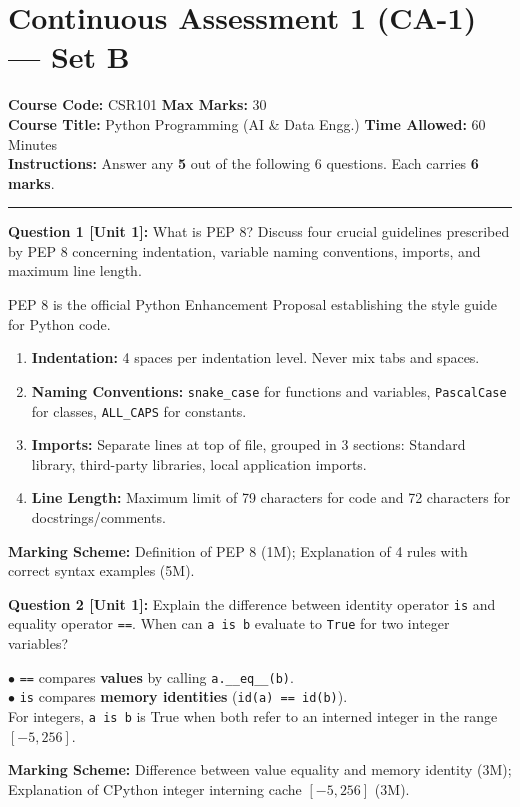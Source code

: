 \section{Continuous Assessment 1 (CA-1) --- Set B}
\noindent\textbf{Course Code:} CSR101 \hfill \textbf{Max Marks:} 30\\
\textbf{Course Title:} Python Programming (AI \& Data Engg.) \hfill \textbf{Time Allowed:} 60 Minutes\\
\textbf{Instructions:} Answer any \textbf{5} out of the following 6 questions. Each carries \textbf{6 marks}.
\vspace{4mm}
\hrule
\vspace{4mm}

\noindent\textbf{Question 1 [Unit 1]:} What is PEP 8? Discuss four crucial guidelines prescribed by PEP 8 concerning indentation, variable naming conventions, imports, and maximum line length.
\begin{solutionbox}
PEP 8 is the official Python Enhancement Proposal establishing the style guide for Python code.
\begin{enumerate}[leftmargin=1.5em, itemsep=2pt]
    \item \textbf{Indentation:} 4 spaces per indentation level. Never mix tabs and spaces.
    \item \textbf{Naming Conventions:} \texttt{snake\_case} for functions and variables, \texttt{PascalCase} for classes, \texttt{ALL\_CAPS} for constants.
    \item \textbf{Imports:} Separate lines at top of file, grouped in 3 sections: Standard library, third-party libraries, local application imports.
    \item \textbf{Line Length:} Maximum limit of 79 characters for code and 72 characters for docstrings/comments.
\end{enumerate}
\end{solutionbox}
\begin{markingrubric}
\textbf{Marking Scheme:} Definition of PEP 8 (1M); Explanation of 4 rules with correct syntax examples (5M).
\end{markingrubric}

\noindent\textbf{Question 2 [Unit 1]:} Explain the difference between identity operator \texttt{is} and equality operator \texttt{==}. When can \texttt{a is b} evaluate to \texttt{True} for two integer variables?
\begin{solutionbox}
$\bullet$ \texttt{==} compares \textbf{values} by calling \texttt{a.\_\_eq\_\_(b)}.\\
$\bullet$ \texttt{is} compares \textbf{memory identities} (\texttt{id(a) == id(b)}).\\
For integers, \texttt{a is b} is True when both refer to an interned integer in the range $[-5, 256]$.
\end{solutionbox}
\begin{markingrubric}
\textbf{Marking Scheme:} Difference between value equality and memory identity (3M); Explanation of CPython integer interning cache $[-5, 256]$ (3M).
\end{markingrubric}

